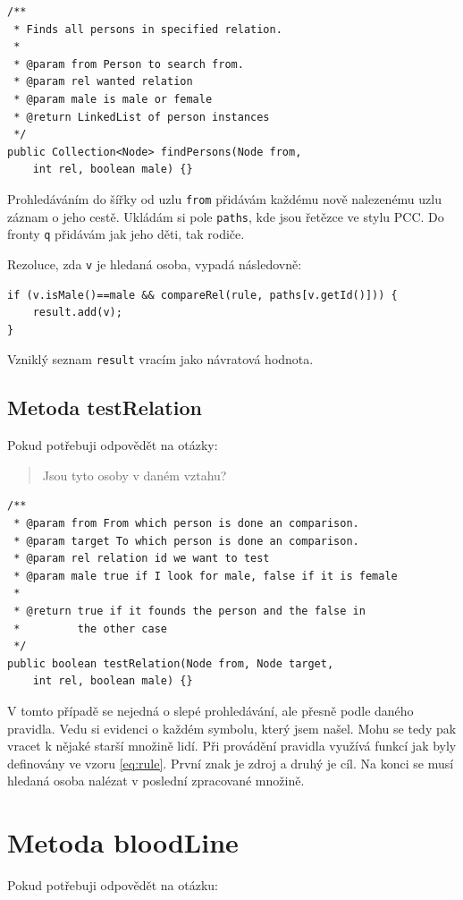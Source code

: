 \documentclass[a4paper, 12pt]{article}
\begin{document}
\begin{verbatim}
/**
 * Finds all persons in specified relation.
 * 
 * @param from Person to search from.
 * @param rel wanted relation
 * @param male is male or female
 * @return LinkedList of person instances
 */
public Collection<Node> findPersons(Node from,
    int rel, boolean male) {}
\end{verbatim}

Prohledáváním do šířky od uzlu \texttt{from} přidávám každému
nově nalezenému uzlu záznam o jeho cestě. Ukládám si pole
\texttt{paths}, kde jsou řetězce ve stylu PCC. Do fronty \texttt{q}
přidávám jak jeho děti, tak rodiče.

Rezoluce, zda \texttt{v} je hledaná osoba, vypadá následovně:

\begin{verbatim}
if (v.isMale()==male && compareRel(rule, paths[v.getId()])) {
    result.add(v);
}
\end{verbatim}

Vzniklý seznam \texttt{result} vracím jako návratová hodnota.

\subsection{Metoda testRelation}
Pokud potřebuji odpovědět na otázky:

\begin{quote}
Jsou tyto osoby v daném vztahu?
\end{quote}

\begin{verbatim}
/**
 * @param from From which person is done an comparison.
 * @param target To which person is done an comparison.
 * @param rel relation id we want to test
 * @param male true if I look for male, false if it is female
 * 
 * @return true if it founds the person and the false in
 *         the other case
 */
public boolean testRelation(Node from, Node target,
    int rel, boolean male) {}
\end{verbatim}

V tomto případě se nejedná o slepé prohledávání, ale přesně podle
daného pravidla. Vedu si evidenci o každém symbolu, který
jsem našel. Mohu se tedy pak vracet k nějaké starší množině lidí.
Při provádění pravidla využívá funkcí jak byly definovány ve vzoru \ref{eq:rule}.
První znak je zdroj a druhý je cíl. Na konci se musí hledaná osoba nalézat
v poslední zpracované množině.

\section{Metoda bloodLine}
Pokud potřebuji odpovědět na otázku:
\end{document}
